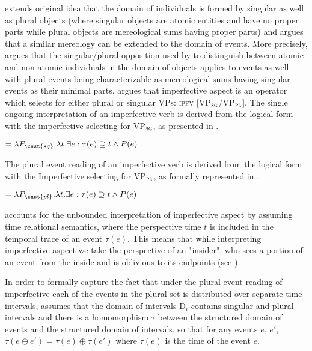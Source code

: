 \documentclass[output=paper]{langscibook}
\begin{document}
\citet{Ferreira2004, Ferreira2005} extends  original idea that the domain of individuals is formed by singular as well as plural objects (where singular objects are atomic entities and have no proper parts while plural objects are mereological sums having proper parts) and argues that a similar mereology can be extended to the domain of events. More precisely, \citet{Ferreira2004, Ferreira2005} argues that the singular/plural opposition used by \citet{Link1983} to distinguish between atomic and non-atomic individuals in the domain of objects applies to events as well with plural events being characterizable as mereological sums having singular events as their minimal parts. \citet{Ferreira2004, Ferreira2005} argues that imperfective aspect is an operator which selects for either plural or singular VPs: \textsc{ipfv} [VP$_\textsc{sg}$/VP$_\textsc{pl}$]. The single ongoing interpretation of an imperfective verb is derived from the logical form with the imperfective selecting for VP$_\textsc{sg}$, as presented in .

\ea {} $= \lambda P_\cnst{sg}. \lambda t. \exists e : \tau(e) \supseteq t \wedge P(e)$\label{jan-bla:fansb:kb:ex11}
\z 

\noindent The plural event reading of an imperfective verb is derived from the logical form with the Imperfective selecting for VP$_\textsc{pl}$, as formally represented in .

\ea {} $= \lambda P_\cnst{pl}. \lambda t. \exists e : \tau(e) \supseteq t \wedge P(e)$\label{jan-bla:fansb:kb:ex12}
\z 

\noindent \citet{Ferreira2004, Ferreira2005} accounts for the unbounded interpretation of imperfective aspect by assuming  time relational semantics, where the perspective time $t$ is included in the temporal trace of an event $\tau(e)$. This means that while interpreting imperfective aspect we take the perspective of an "insider", who sees a portion of an event from the inside and is oblivious to its endpoints (see \citealt{KazaninaandPhillips2003}). 

In order to formally capture the fact that under the plural event reading of imperfective each of the events in the plural set is distributed over separate time intervals, \citet{Ferreira2004, Ferreira2005} assumes that the domain of intervals D$_i$ contains singular and plural intervals and there is a homomorphism $\tau$ between the structured domain of events and the structured domain of intervals, so that for any events $e$, $e'$, $\tau (e\oplus e') = \tau(e)\oplus \tau(e')$ where $\tau(e)$ is the time of the event $e$. 
\end{document}
